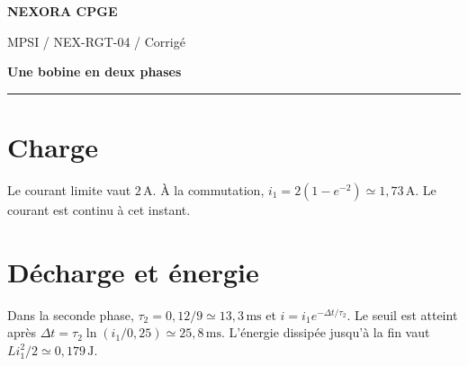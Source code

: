 \documentclass[11pt,a4paper]{article}
\begin{document}
{\small\bfseries\color{nexorablue} NEXORA CPGE}\par
{\small MPSI / NEX-RGT-04 / Corrigé}\par
{\LARGE\bfseries Une bobine en deux phases}\par
\vspace{0.25em}\hrule\vspace{0.6em}

\section*{Charge}
Le courant limite vaut $2\,\mathrm A$. À la commutation, $i_1=2(1-e^{-2})\simeq1{,}73\,\mathrm A$. Le courant est continu à cet instant.

\section*{Décharge et énergie}
Dans la seconde phase, $\tau_2=0{,}12/9\simeq13{,}3\,\mathrm{ms}$ et $i=i_1e^{-\Delta t/\tau_2}$. Le seuil est atteint après $\Delta t=\tau_2\ln(i_1/0{,}25)\simeq25{,}8\,\mathrm{ms}$. L’énergie dissipée jusqu’à la fin vaut $Li_1^2/2\simeq0{,}179\,\mathrm J$.
\end{document}
